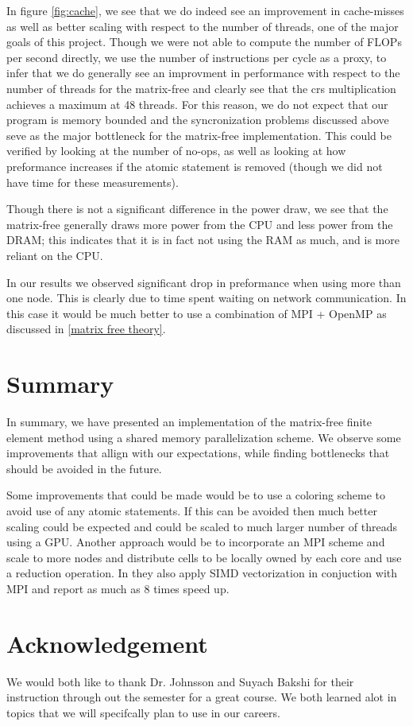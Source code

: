 \documentclass[12pt]{article}
\begin{document}
In figure \ref{fig:cache}, we see that we do indeed see an improvement in cache-misses as well as better scaling with respect to the number of threads, one of the major goals of this project. Though we were not able to compute the number of FLOPs per second directly, we use the number of instructions per cycle as a proxy, to infer that we do generally see an improvment in performance with respect to the number of threads for the matrix-free and clearly see that the crs multiplication achieves a maximum at 48 threads. For this reason, we do not expect that our program is memory bounded and the syncronization problems discussed above seve as the major bottleneck for the matrix-free implementation. This could be verified by looking at the number of no-ops, as well as looking at how preformance increases if the atomic statement is removed (though we did not have time for these measurements).

Though there is not a significant difference in the power draw, we see that the matrix-free generally draws more power from the CPU and less power from the DRAM; this indicates that it is in fact not using the RAM as much, and is more reliant on the CPU. 

In our results we observed significant drop in preformance when using more than one node. This is clearly due to time spent waiting on network communication. In this case it would be much better to use a combination of MPI + OpenMP as discussed in \ref{matrix free theory}. 

\section{Summary}
In summary, we have presented an implementation of the matrix-free finite element method using a shared memory parallelization scheme. We observe some improvements that allign with our expectations, while finding bottlenecks that should be avoided in the future.

Some improvements that could be made would be to use a coloring scheme to avoid use of any atomic statements. If this can be avoided then much better scaling could be expected and could be scaled to much larger number of threads using a GPU. Another approach would be to incorporate an MPI scheme and scale to more nodes and distribute cells to be locally owned by each core and use a reduction operation. In \cite{setp37} they also apply SIMD vectorization in conjuction with MPI and report as much as 8 times speed up. 

\section*{Acknowledgement}
We would both like to thank Dr. Johnsson and Suyach Bakshi for their instruction through out the semester for a great course. We both learned alot in topics that we will specifcally plan to use in our careers. 




\end{document}
